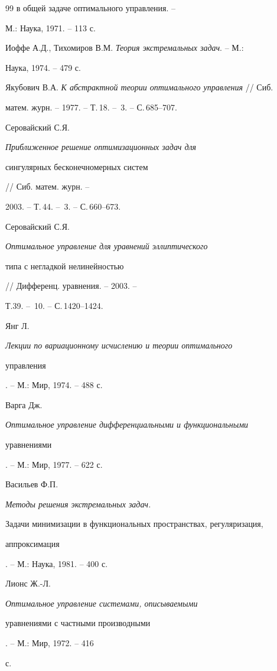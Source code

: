 \begin{thebibliography}{99}
{в общей задаче оптимального управления}. -- 


М.: Наука, 1971. -- 113 с. 




Иоффе А.Д., Тихомиров В.М. {\em Теория экстремальных задач}. -- М.: 


Наука, 1974. -- 479 с. 




Якубович В.А. {\em К абстрактной теории оптимального управления} // Сиб. 


матем. журн. -- 1977. -- Т.\,18. -- \No\,3. -- С.\,685--707. 




Серовайский С.Я. {\em Приближенное решение оптимизационных задач для 


сингулярных бесконечномерных систем} // Сиб. матем. журн. -- 


2003. -- Т.\,44. -- \No\,3. -- С.\,660--673. 




Серовайский С.Я. {\em Оптимальное управление для уравнений эллиптического 


типа с негладкой нелинейностью} // Дифференц. уравнения. -- 2003. -- 


Т.39. -- \No\,10. -- С.\,1420--1424. 




Янг Л. {\em Лекции по вариационному исчислению и теории оптимального 


управления}. -- М.: Мир, 1974. -- 488 с. 




Варга Дж. {\em Оптимальное управление дифференциальными и функциональными 


уравнениями}. -- М.: Мир, 1977. -- 622 с. 




Васильев Ф.П. {\em Методы решения экстремальных задач. 


Задачи минимизации в функциональных пространствах, регуляризация, 


аппроксимация}. -- М.: Наука, 1981. -- 400 с. 




Лионс Ж.-Л. {\em Оптимальное управление системами, описываемыми 


уравнениями с частными производными}. -- М.: Мир, 1972. -- 416 


с. 


 


\end{thebibliography} 


 


\vskip 2cm 


 






 


\label{end} 


 



